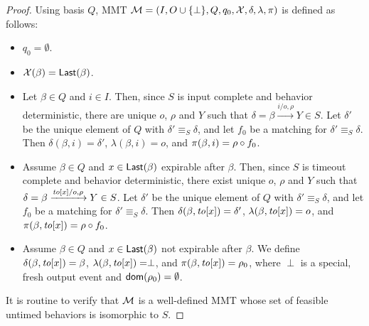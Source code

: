 \begin{proof}
Using basis $Q$, MMT ${\mathcal M} = (I, O \cup \{ \perp \}, Q, q_0, \mathcal{X}, \delta, \lambda, \pi)$ is defined as follows:
\begin{itemize}
\item
$q_0 = \emptyset$.
\item
$\mathcal{X}(\beta) = \mathsf{Last}({\beta})$.
\item
Let $\beta \in Q$ and $i \in I$. Then, since $S$ is input complete and behavior deterministic, there are unique
$o$, $\rho$ and $Y$ such that $\delta = \beta \xrightarrow{i/o, \rho} Y \in S$.
Let $\delta'$ be the unique element of $Q$ with $\delta' \equiv_S \delta$, and
let $f_0$ be a matching for $\delta' \equiv_S \delta$.
Then $\delta(\beta,i) = \delta'$, $\lambda(\beta,i) = o$, and $\pi(\beta,i) = \rho  \circ f_0$.
\item
Assume $\beta \in Q$ and $x\in \mathsf{Last}({\beta})$ expirable after $\beta$. 
Then, since $S$ is  timeout complete and behavior deterministic, there exist unique
$o$, $\rho$ and $Y$ such that $\delta = \beta \xrightarrow{\mathit{to}[x]/o, \rho} Y \in S$.
Let $\delta'$ be the unique element of $Q$ with $\delta' \equiv_S \delta$, and
let $f_0$ be a matching for $\delta' \equiv_S \delta$.
Then $\delta(\beta,\mathit{to}[x]) = \delta'$, $\lambda(\beta,\mathit{to}[x]) = o$, and $\pi(\beta,\mathit{to}[x]) = \rho \circ f_0$.
\item
Assume $\beta \in Q$ and $x \in \mathsf{Last}({\beta})$ not expirable after $\beta$.
We define $\delta(\beta,\mathit{to}[x]) = \beta$, $\lambda(\beta,\mathit{to}[x]) = \perp$, and $\pi(\beta,\mathit{to}[x]) = \rho_0$, 
where $\perp$ is a special, fresh output event and ${\textsf{dom}}(\rho_0) = \emptyset$.
\end{itemize}
It is routine to verify that ${\mathcal M}$ is a well-defined MMT whose set of feasible untimed behaviors is isomorphic to $S$.
\end{proof}
